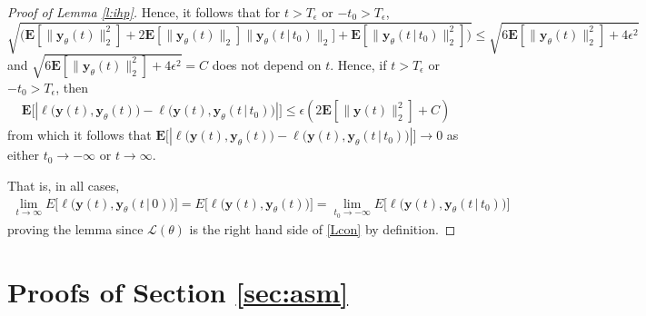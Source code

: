 \documentclass{article}
\newcommand{\y}{\mathbf{y}}
\newcommand{\bE}{\mathbf{E}}
\begin{document}
\begin{proof}[Proof of Lemma \ref{l:ihp}]
Hence, it follows that for $t > T_{\epsilon}$ or $-t_0 > T_{\epsilon}$,
\[ \sqrt{(\bE[\|\y_\theta(t)\|_2^2] +2\bE[\|\y_\theta(t)\|_2]\|\y_\theta(t\,|\,t_0)\|_2]+\bE[\|\y_\theta(t\,|\,t_0)\|_2^2]\big)}
\le \sqrt{6\bE[\|\y_\theta(t)\|_2^2] + 4\epsilon^2} 
\]
and 
$\sqrt{6\bE[\|\y_\theta(t)\|_2^2] + 4\epsilon^2}=C$ does not depend on $t$.
Hence, if $t > T_{\epsilon}$ or $-t_0 > T_{\epsilon}$, then
\begin{align*} 
\bE\big[\left|\ell\big(\y(t),\y_\theta(t)\big)-\ell\big(\y(t),\y_\theta(t\,|\,t_0)\big)\right|\big]
\leq \epsilon (2\bE[\|\y(t)\|_2^2]+C)
\end{align*}
from which  it follows that 
$\bE\big[\left|\ell\big(\y(t),\y_\theta(t)\big)-\ell\big(\y(t),\y_\theta(t\,|\,t_0)\big)\right|\big] \to 0$
as either $t_0 \to -\infty$ or $t \to \infty$.


That is, in all cases, 
\begin{align}\label{Lcon}\displaystyle 
\lim_{t\to\infty} E\big[\ell\big(\y(t),\y_\theta(t\,|\,0)\big)\big]
= E\big[\ell\big(\y(t),\y_\theta(t)\big)\big]%
=\lim_{t_0\to -\infty} E\big[\ell\big(\y(t),\y_\theta(t\,|\,t_0)\big)\big]
\end{align}
proving the lemma since $\mathcal L(\theta)$ is the right hand side of \eqref{Lcon} by definition.
\end{proof}

\section{Proofs of Section \ref{sec:asm}}
\label{app:constants}
\end{document}

